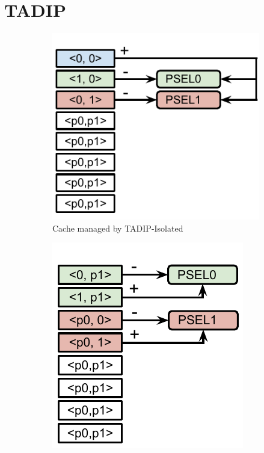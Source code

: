 \section{TADIP}
\label{sec:algorithms:tadip}

\begin{figure}[H]
    \centering
    \begin{subfigure}[b]{0.5\textwidth}
        \includegraphics[width=\textwidth]{figures/algorithms/TADIP-I}
        \caption{Cache managed by TADIP-Isolated}
        \label{fig:algorithms:tadip:isolated}
    \end{subfigure}
    \begin{subfigure}[b]{0.5\textwidth}
        \includegraphics[width=\textwidth]{figures/algorithms/TADIP-F}

\end{subfigure}
\end{figure}
